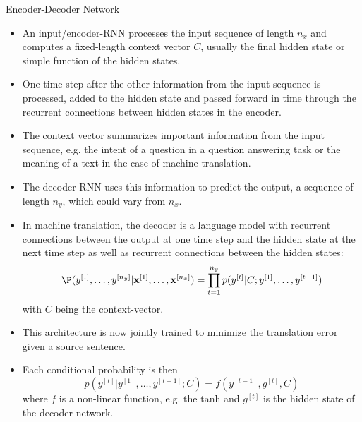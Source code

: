 \documentclass[11pt,compress,t,notes=noshow, xcolor=table]{beamer}
\begin{document}
\begin{vbframe}{Encoder-Decoder Network}
\begin{itemize}
    \item An input/encoder-RNN processes the input sequence of length $n_x$ and computes a fixed-length context vector $C$, usually the final hidden state or  simple function of the hidden states.
    \item One time step after the other information from the input sequence is processed, added to the hidden state and passed forward in time through the recurrent connections between hidden states in the encoder.
    \item  The context vector summarizes important information from the input sequence, e.g. the intent of a question in a question answering task or the meaning of a text in the case of machine translation.
    \item The decoder RNN uses this information to predict the output, a sequence of length $n_y$, which could vary from $n_x$. 
    \item In machine translation, the decoder is a language model with recurrent connections between the output at one time step and the hidden state at the next time step as well as recurrent connections between the hidden states:
    $$\P(y^{[1]}, \dots, y^{[n_y]}|\textbf{x}^{[1]},  \dots, \textbf{x}^{[n_x]}) = \displaystyle \prod_{t=1}^{n_y} p(y^{[t]}|C; y^{[1]}, \dots, y^{[t-1]})$$ with $C$ being the context-vector.
    \item This architecture is now jointly trained to minimize the translation
error given a source sentence.
    \item Each conditional probability is then $$p(y^{[t]}|y^{[1]}, \dots, y^{[t-1]};C) = f(y^{[t-1]}, g^{[t]}, C)$$ where $f$ is a non-linear function, e.g. the tanh and $g^{[t]}$ is the hidden state of the decoder network.
  \end{itemize}
\end{vbframe}
\end{document}
